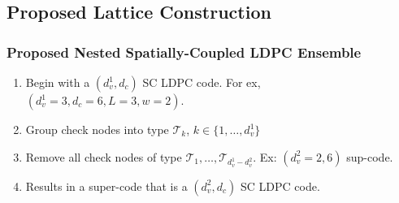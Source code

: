 \documentclass[10pt]{beamer}
\begin{document}
\subsection{Proposed Lattice Construction}
\begin{frame}\frametitle{Proposed Nested Spatially-Coupled LDPC Ensemble}
    \begin{enumerate}
        \item<1-> Begin with a $(d_v^1,d_c)$ SC LDPC code. For ex, $(d_v^1=3,d_c=6,L=3,w=2)$. 
        \item<1-> Group check nodes into type $\mathcal{T}_k$, $k\in\{1,\ldots,d_v^1\}$
         \vspace{2pt}
        \item<2-> Remove all check nodes of type $\mathcal{T}_1,\ldots,\mathcal{T}_{d_v^1-d_v^2}$. Ex: $(d_{v}^{2}=2,6)$ sup-code.
                 \vspace{2pt}
        \item<3-> Results in a super-code that is a $(d_v^2,d_c)$ SC LDPC code.
    \end{enumerate}
    \vspace{0.15in}
    \begin{figure}
        \begin{center}

\end{center}
\end{figure}
\end{frame}
\end{document}
